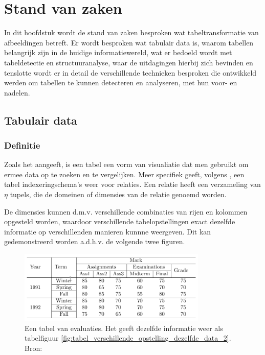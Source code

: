 \chapter{Stand van zaken}
\label{ch:stand-van-zaken}



In dit hoofdstuk wordt de stand van zaken besproken wat tabeltransformatie van afbeeldingen betreft. Er wordt besproken wat tabulair data is, waarom tabellen belangrijk zijn in de huidige informatiewereld, wat er bedoeld wordt met tabeldetectie en structuuranalyse, waar de uitdagingen hierbij zich bevinden en tenslotte wordt er in detail de verschillende technieken besproken die ontwikkeld werden om tabellen te kunnen detecteren en analyseren, met hun voor- en nadelen.

\section{Tabulair data}
\label{sec:tabulair-data}

\subsection{Definitie}
\label{subsec:definitie-tabulair-data}

Zoals \textcite{Zanibbi2003} het aangeeft, is een tabel een vorm van visualiatie dat men gebruikt om ermee data op te zoeken en te vergelijken. Meer specifiek geeft, volgens \textcite{Zanibbi2003}, een tabel indexeringschema's weer voor relaties. Een relatie heeft een verzameling van $\eta$ \glspl{tupel}, die de domeinen of dimensies van de relatie genoemd worden.

De dimensies kunnen d.m.v. verschillende combinaties van rijen en kolommen opgesteld worden, waardoor verschillende tabelopstellingen exact dezelfde informatie op verschillenden manieren kunnne weergeven. Dit kan gedemonstreerd worden a.d.h.v. de volgende twee figuren.

\begin{figure}[H]
    \centering
    \includegraphics[width=0.8\textwidth]{img/tabel_verschillende_opstelling_dezelfde_data_1.png}
    \caption{Een tabel van evaluaties. Het geeft dezelfde informatie weer als tabelfiguur \ref{fig:tabel_verschillende_opstelling_dezelfde_data_2}. Bron: \cite{Long2010}}
    \label{fig:tabel_verschillende_opstelling_dezelfde_data_1}
\end{figure}

